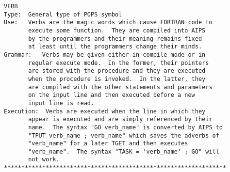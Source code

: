 
\vskip 0.5pt
\bbve\begin{verbatim}
VERB
Type:  General type of POPS symbol
Use:   Verbs are the magic words which cause FORTRAN code to
       execute some function.  They are compiled into AIPS
       by the programmers and their meaning remains fixed
       at least until the programmers change their minds.
Grammar:   Verbs may be given either in compile mode or in
       regular execute mode.  In the former, their pointers
       are stored with the procedure and they are executed
       when the procedure is invoked.  In the latter, they
       are compiled with the other statements and parameters
       on the input line and then executed before a new
       input line is read.
Execution:  Verbs are executed when the line in which they
       appear is executed and are simply referenced by their
       name.  The syntax "GO verb_name" is converted by AIPS to
       "TPUT verb_name ; verb_name" which saves the adverbs of
       "verb_name" for a later TGET and then executes
       "verb_name".  The syntax "TASK = 'verb_name' ; GO" will
       not work.
****************************************************************


\end{verbatim}
